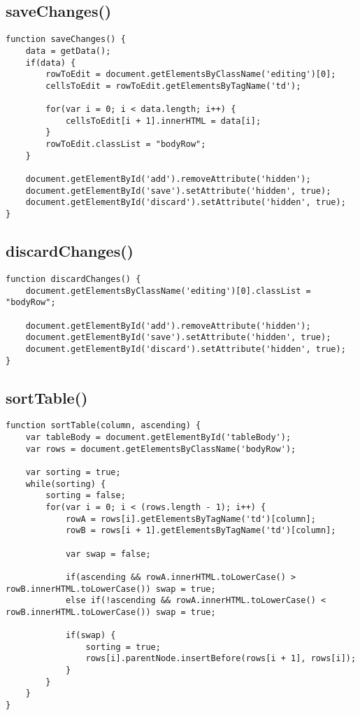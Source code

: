 \documentclass[letterpaper]{article}
\begin{document}
\subsection{saveChanges()}

\begin{lstlisting}[firstnumber=204]
function saveChanges() {
    data = getData();
    if(data) {
        rowToEdit = document.getElementsByClassName('editing')[0];
        cellsToEdit = rowToEdit.getElementsByTagName('td');

        for(var i = 0; i < data.length; i++) {
            cellsToEdit[i + 1].innerHTML = data[i];
        }
        rowToEdit.classList = "bodyRow";
    }

    document.getElementById('add').removeAttribute('hidden');
    document.getElementById('save').setAttribute('hidden', true);
    document.getElementById('discard').setAttribute('hidden', true);
}
\end{lstlisting}

\subsection{discardChanges()}

\begin{lstlisting}[firstnumber=221]
function discardChanges() {
    document.getElementsByClassName('editing')[0].classList = "bodyRow";

    document.getElementById('add').removeAttribute('hidden');
    document.getElementById('save').setAttribute('hidden', true);
    document.getElementById('discard').setAttribute('hidden', true);
}
\end{lstlisting}

\subsection{sortTable()}

\begin{lstlisting}[firstnumber=229]
function sortTable(column, ascending) {
    var tableBody = document.getElementById('tableBody');
    var rows = document.getElementsByClassName('bodyRow');

    var sorting = true;
    while(sorting) {
        sorting = false;
        for(var i = 0; i < (rows.length - 1); i++) {
            rowA = rows[i].getElementsByTagName('td')[column];
            rowB = rows[i + 1].getElementsByTagName('td')[column];

            var swap = false;

            if(ascending && rowA.innerHTML.toLowerCase() > rowB.innerHTML.toLowerCase()) swap = true;
            else if(!ascending && rowA.innerHTML.toLowerCase() < rowB.innerHTML.toLowerCase()) swap = true;

            if(swap) {
                sorting = true;
                rows[i].parentNode.insertBefore(rows[i + 1], rows[i]);
            }
        }
    }
}
\end{lstlisting}
\end{document}
